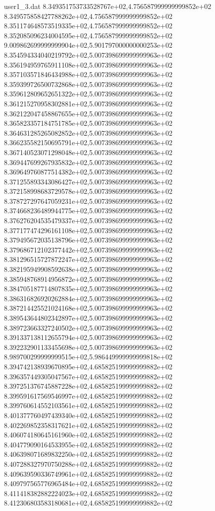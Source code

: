 \begin{filecontents}{user1_3.dat}
8.349351753733528767e+02,4.756587999999999852e+02
8.349575858427788262e+02,4.756587999999999852e+02
8.351174648573519335e+02,4.756587999999999852e+02
8.352085096234004595e+02,4.756587999999999852e+02
9.009862699999999904e+02,5.901797000000000253e+02
8.354594334040219792e+02,5.007398699999999963e+02
8.356194959765911108e+02,5.007398699999999963e+02
8.357103571846434988e+02,5.007398699999999963e+02
8.359399726500732868e+02,5.007398699999999963e+02
8.359612809652651322e+02,5.007398699999999963e+02
8.361215270958302881e+02,5.007398699999999963e+02
8.362122047458867655e+02,5.007398699999999963e+02
8.365823357184751785e+02,5.007398699999999963e+02
8.364631285265082852e+02,5.007398699999999963e+02
8.366235582150695791e+02,5.007398699999999963e+02
8.367140523071298048e+02,5.007398699999999963e+02
8.369447699267935832e+02,5.007398699999999963e+02
8.369649760877514382e+02,5.007398699999999963e+02
8.371255893343086427e+02,5.007398699999999963e+02
8.372158998683729578e+02,5.007398699999999963e+02
8.378727297647059231e+02,5.007398699999999963e+02
8.374668236489944775e+02,5.007398699999999963e+02
8.376276204535479337e+02,5.007398699999999963e+02
8.377177474296161108e+02,5.007398699999999963e+02
8.379495672035138796e+02,5.007398699999999963e+02
8.379686712102377442e+02,5.007398699999999963e+02
8.381296515727872247e+02,5.007398699999999963e+02
8.382195949908592638e+02,5.007398699999999963e+02
8.385948768914956872e+02,5.007398699999999963e+02
8.384705187714807835e+02,5.007398699999999963e+02
8.386316826920262884e+02,5.007398699999999963e+02
8.387214425521024168e+02,5.007398699999999963e+02
8.389543644802342897e+02,5.007398699999999963e+02
8.389723663327240502e+02,5.007398699999999963e+02
8.391337138112655794e+02,5.007398699999999963e+02
8.392232901133455698e+02,5.007398699999999963e+02
8.989700299999999515e+02,5.986449999999999818e+02
8.394742138939670895e+02,4.685825199999999882e+02
8.396357449305047567e+02,4.685825199999999882e+02
8.397251376745887228e+02,4.685825199999999882e+02
8.399591617569546997e+02,4.685825199999999882e+02
8.399760614552103561e+02,4.685825199999999882e+02
8.401377760497439340e+02,4.685825199999999882e+02
8.402269852358317621e+02,4.685825199999999882e+02
8.406074180645161960e+02,4.685825199999999882e+02
8.404779090164533955e+02,4.685825199999999882e+02
8.406398071689832250e+02,4.685825199999999882e+02
8.407288327970750288e+02,4.685825199999999882e+02
8.409639590336749961e+02,4.685825199999999882e+02
8.409797565776965484e+02,4.685825199999999882e+02
8.411418382882224023e+02,4.685825199999999882e+02
8.412306803583180681e+02,4.685825199999999882e+02

\end{filecontents}
